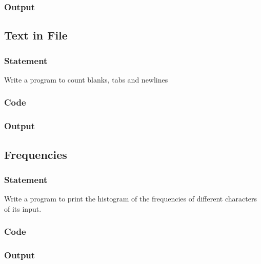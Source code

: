 \subsubsection{Output}

\pagebreak
\subsection{Text in File}
\subsubsection{Statement}
Write a program to count blanks, tabs and newlines
\subsubsection{Code}
\subsubsection{Output}

\pagebreak
\subsection{Frequencies}
\subsubsection{Statement}
Write a program to print the histogram of the frequencies of different characters of its input.
\subsubsection{Code}
\subsubsection{Output}